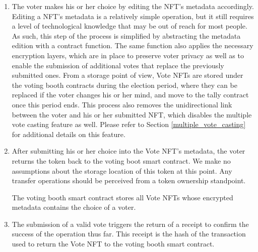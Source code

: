 \documentclass[../main.tex]{subfiles}
\begin{document}
\begin{enumerate}
                \item{The voter makes his or her choice by editing the NFT's metadata accordingly. Editing a NFT's metadata is a relatively simple operation, but it still requires a level of technological knowledge that may be out of reach for most people. As such, this step of the process is simplified by abstracting the metadata edition with a contract function. The same function also applies the necessary encryption layers, which are in place to preserve voter privacy as well as to enable the submission of additional votes that replace the previously submitted ones. From a storage point of view, Vote NFTs are stored under the voting booth contracts during the election period, where they can be replaced if the voter changes his or her mind, and move to the tally contract once this period ends. This process also removes the unidirectional link between the voter and his or her submitted NFT, which disables the multiple vote casting feature as well. Please refer to Section \ref{multiple_vote_casting} for additional details on this feature.}

                \item{After submitting his or her choice into the Vote NFT's metadata, the voter returns the token back to the voting boot smart contract. We make no assumptions about the storage location of this token at this point. Any transfer operations should be perceived from a token ownership standpoint.
                \par
                The voting booth smart contract stores all Vote NFTs whose encrypted metadata contains the choice of a voter.}

                \item{The submission of a valid vote triggers the return of a receipt to confirm the success of the operation thus far. This receipt is the hash of the transaction used to return the Vote NFT to the voting booth smart contract.}


\end{enumerate}
\end{document}
